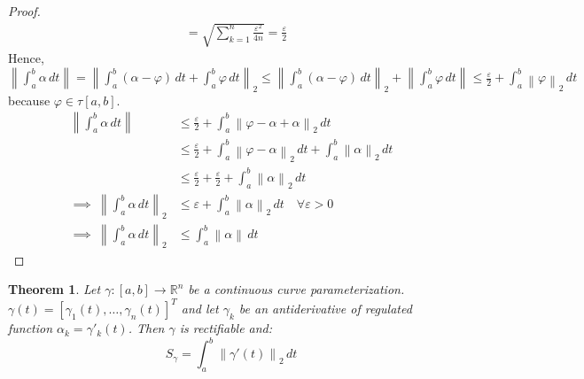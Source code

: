 \documentclass{article}
\newtheorem{theorem}{Theorem}  \numberwithin{theorem}{section}
\newcommand{\norm}[1]{\left\|#1\right\|}
\begin{document}
\begin{proof}
\begin{align*}
      &= \sqrt{\sum_{k=1}^n \frac{\varepsilon^2}{4n}} = \frac\varepsilon2
  \end{align*}
  Hence, $\norm{\int_a^b \alpha \, dt} = \norm{\int_a^b (\alpha - \varphi) \, dt + \int_a^b \varphi \, dt}_2 \leq \norm{\int_a^b (\alpha - \varphi) \, dt}_2 + \norm{\int_a^b \varphi \, dt} \leq \frac{\varepsilon}{2} + \int_a^b \norm{\varphi}_2 \, dt$ because $\varphi \in \tau[a,b]$.
  \begin{align*}
    \norm{\int_a^b \alpha \, dt}
      &\leq \frac{\varepsilon}{2} + \int_a^b \norm{\varphi - \alpha + \alpha}_2 \, dt \\
      &\leq \frac{\varepsilon}{2} + \int_a^b \norm{\varphi - \alpha}_2 \, dt + \int_a^b \norm{\alpha}_2 \, dt \\
      &\leq \frac\varepsilon2 + \frac\varepsilon2 + \int_a^b \norm{\alpha}_2 \, dt \\
    \implies \: \norm{\int_a^b \alpha \, dt}_2 &\leq \varepsilon + \int_a^b \norm{\alpha}_2 \, dt \quad \forall \varepsilon > 0 \\
    \implies \: \norm{\int_a^b \alpha \, dt}_2 &\leq \int_a^b \norm{\alpha} \, dt
  \end{align*}
\end{proof}

\begin{theorem} %
  Let $\gamma: [a,b] \to \mathbb R^n$ be a continuous curve parameterization.
  $\gamma(t) = [\gamma_1(t), \dots, \gamma_n(t)]^T$ and let $\gamma_k$ be an antiderivative of regulated function $\alpha_k = \gamma'_k(t)$.
  Then $\gamma$ is rectifiable and:
  \[ S_\gamma = \int_a^b \norm{\gamma'(t)}_2 \, dt \]
\end{theorem}
\end{document}
